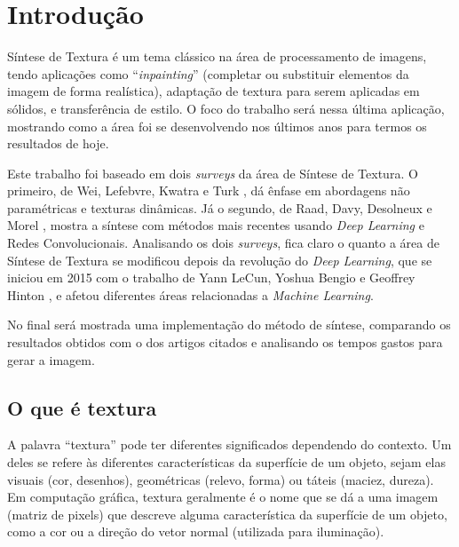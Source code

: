 \chapter{Introdução}










Síntese de Textura é um tema clássico na área de
processamento de imagens, tendo aplicações como
``\textit{inpainting}'' (completar ou substituir
elementos da imagem de forma realística), 
adaptação de textura para serem aplicadas em sólidos,
e transferência de estilo. O foco do trabalho será
nessa última aplicação, mostrando como a área foi
se desenvolvendo nos últimos anos para termos
os resultados de hoje.


Este trabalho foi baseado em dois \textit{surveys}
da área de Síntese de Textura.
O primeiro, de Wei, Lefebvre, Kwatra
e Turk \cite{Wei2009}, dá ênfase em
abordagens não paramétricas e texturas
dinâmicas. Já o segundo, de Raad, Davy, 
Desolneux e Morel \cite{Raad2018}, mostra
a síntese com métodos mais recentes
usando \textit{Deep Learning} e Redes Convolucionais.
Analisando os dois \textit{surveys}, fica claro o 
quanto a área de Síntese de Textura se modificou depois da
revolução do \textit{Deep Learning}, que se iniciou 
em 2015 com o trabalho de Yann LeCun, 
Yoshua Bengio e Geoffrey Hinton \cite{LeCun2015},
e afetou diferentes áreas relacionadas a \textit{Machine Learning}.

No final será mostrada uma implementação
do método de síntese, comparando os resultados
obtidos com o dos artigos citados e analisando
os tempos gastos para gerar a imagem.

\section{O que é textura}



A palavra ``textura'' pode ter diferentes significados
dependendo do contexto.
Um deles se refere às
diferentes características da superfície de um objeto,
sejam elas visuais (cor, desenhos), geométricas (relevo,
forma) ou táteis (maciez, dureza). 
Em computação gráfica, textura geralmente é
o nome que se dá a uma imagem (matriz de pixels)
que descreve alguma
característica da superfície de um objeto,
como a cor ou a direção do vetor normal (utilizada
para iluminação).

